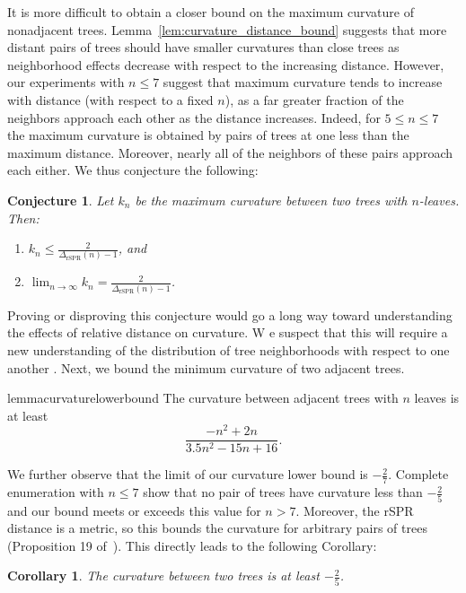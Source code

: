 \documentclass[11pt]{amsart}
\newtheorem{corollary}[theorem]{Corollary}
\newtheorem{conjecture}[theorem]{Conjecture}
\newcommand{\cuttable}[2][]{%
    \ifthenelse{\equal{#1}{}}%
		{}%
		{#1}%
}
\begin{document}
It is more difficult to obtain a closer bound on the maximum curvature of nonadjacent trees.
Lemma~\ref{lem:curvature_distance_bound} suggests that more distant pairs of trees should have smaller curvatures than close trees as neighborhood effects decrease with respect to the increasing distance.
However, our experiments with $n \le 7$ suggest that maximum curvature tends to increase with distance (with respect to a fixed $n$), as a far greater fraction of the neighbors approach each other as the distance increases.
Indeed, for $5 \le n \le 7$ the maximum curvature is obtained by pairs of trees at one less than the maximum distance.
Moreover, nearly all of the neighbors of these pairs approach each either.
We thus conjecture the following:
\begin{conjecture}
	Let $k_n$ be the maximum curvature between two trees with $n$-leaves.
	Then:
	\begin{enumerate}
		\item $k_n \le \frac{2}{\Delta_{\text{rSPR}}(n)-1}$, and
		\item $\lim_{n\rightarrow\infty} k_n  = \frac{2}{\Delta_{\text{rSPR}}(n)-1}$.
	\end{enumerate}
\end{conjecture}
Proving or disproving this conjecture would go a long way toward understanding the effects of relative distance on curvature.
\cuttable[W]{However, w}e suspect that this will require a \cuttable[new]{greater} understanding of the distribution of tree neighborhoods with respect to one another\cuttable{ than is currently known}.
Next, we bound the minimum curvature of two adjacent trees.

\begin{restatable}{lemma}{curvaturelowerbound}
\label{lem:curvature_lower_bound}
	The curvature between adjacent trees with $n$ leaves is at least
	$$\frac{-n^2 + 2n}{3.5n^2 - 15n + 16}.$$
\end{restatable}

We further observe that the limit of our curvature lower bound is $-\frac{2}{7}$.
Complete enumeration with $n \le 7$ show that no pair of trees have curvature less than $-\frac{2}{5}$ and our bound meets or exceeds this value for $n > 7$.
Moreover, the rSPR distance is a metric, so this bounds the curvature for arbitrary pairs of trees (Proposition 19 of~\cite{Ollivier2009-bw}).
This directly leads to the following Corollary:

\begin{corollary}
	The curvature between two trees is at least $-\frac{2}{5}$.
\end{corollary}
\end{document}

